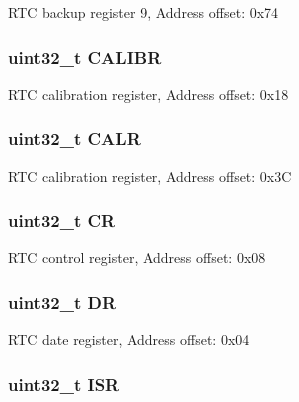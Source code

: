 R\-T\-C backup register 9, Address offset\-: 0x74 \hypertarget{struct_r_t_c___type_def_ab97f3e9584dda705dc10a5f4c5f6e636}{
\subsubsection[{C\-A\-L\-I\-B\-R}]{ uint32\-\_\-t C\-A\-L\-I\-B\-R}}\label{struct_r_t_c___type_def_ab97f3e9584dda705dc10a5f4c5f6e636}
R\-T\-C calibration register, Address offset\-: 0x18 \hypertarget{struct_r_t_c___type_def_a2ce7c3842792c506635bb87a21588b58}{
\subsubsection[{C\-A\-L\-R}]{ uint32\-\_\-t C\-A\-L\-R}}\label{struct_r_t_c___type_def_a2ce7c3842792c506635bb87a21588b58}
R\-T\-C calibration register, Address offset\-: 0x3\-C \hypertarget{struct_r_t_c___type_def_ab40c89c59391aaa9d9a8ec011dd0907a}{
\subsubsection[{C\-R}]{ uint32\-\_\-t C\-R}}\label{struct_r_t_c___type_def_ab40c89c59391aaa9d9a8ec011dd0907a}
R\-T\-C control register, Address offset\-: 0x08 \hypertarget{struct_r_t_c___type_def_a3df0d8dfcd1ec958659ffe21eb64fa94}{
\subsubsection[{D\-R}]{ uint32\-\_\-t D\-R}}\label{struct_r_t_c___type_def_a3df0d8dfcd1ec958659ffe21eb64fa94}
R\-T\-C date register, Address offset\-: 0x04 \hypertarget{struct_r_t_c___type_def_ab3c49a96815fcbee63d95e1e74f20e75}{
\subsubsection[{I\-S\-R}]{ uint32\-\_\-t I\-S\-R}}\label{struct_r_t_c___type_def_ab3c49a96815fcbee63d95e1e74f20e75}
